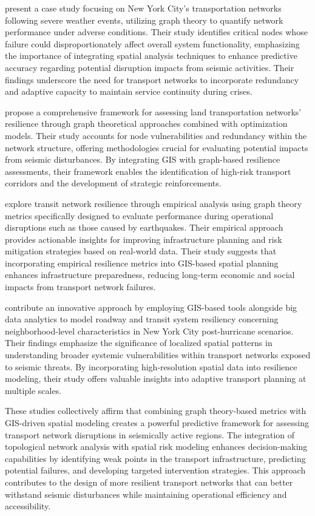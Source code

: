 \cite{zuo2022} present a case study focusing on New York City's transportation networks following severe weather events, utilizing graph theory to quantify network performance under adverse conditions. Their study identifies critical nodes whose failure could disproportionately affect overall system functionality, emphasizing the importance of integrating spatial analysis techniques to enhance predictive accuracy regarding potential disruption impacts from seismic activities. Their findings underscore the need for transport networks to incorporate redundancy and adaptive capacity to maintain service continuity during crises.

\cite{alipour2022} propose a comprehensive framework for assessing land transportation networks' resilience through graph theoretical approaches combined with optimization models. Their study accounts for node vulnerabilities and redundancy within the network structure, offering methodologies crucial for evaluating potential impacts from seismic disturbances. By integrating GIS with graph-based resilience assessments, their framework enables the identification of high-risk transport corridors and the development of strategic reinforcements.

\cite{cox2019} explore transit network resilience through empirical analysis using graph theory metrics specifically designed to evaluate performance during operational disruptions such as those caused by earthquakes. Their empirical approach provides actionable insights for improving infrastructure planning and risk mitigation strategies based on real-world data. Their study suggests that incorporating empirical resilience metrics into GIS-based spatial planning enhances infrastructure preparedness, reducing long-term economic and social impacts from transport network failures.

\cite{chen2016} contribute an innovative approach by employing GIS-based tools alongside big data analytics to model roadway and transit system resiliency concerning neighborhood-level characteristics in New York City post-hurricane scenarios. Their findings emphasize the significance of localized spatial patterns in understanding broader systemic vulnerabilities within transport networks exposed to seismic threats. By incorporating high-resolution spatial data into resilience modeling, their study offers valuable insights into adaptive transport planning at multiple scales.

These studies collectively affirm that combining graph theory-based metrics with GIS-driven spatial modeling creates a powerful predictive framework for assessing transport network disruptions in seismically active regions. The integration of topological network analysis with spatial risk modeling enhances decision-making capabilities by identifying weak points in the transport infrastructure, predicting potential failures, and developing targeted intervention strategies. This approach contributes to the design of more resilient transport networks that can better withstand seismic disturbances while maintaining operational efficiency and accessibility.

